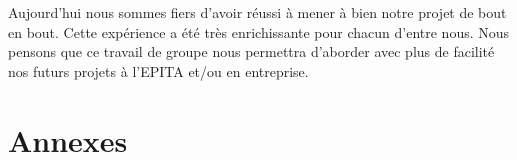 \documentclass[11pt]{report}
\begin{document}
Aujourd'hui nous sommes fiers d'avoir réussi à mener à bien notre projet de bout en bout. Cette expérience a été très enrichissante pour chacun d'entre nous. Nous pensons que ce travail de groupe nous permettra d'aborder avec plus de facilité nos futurs projets à l'EPITA et/ou en entreprise.

\newpage
{}
\part*{Annexes}


\nocite{*}


\newpage
\listoffigures

\newpage
\tableofcontents
 
\end{document}
